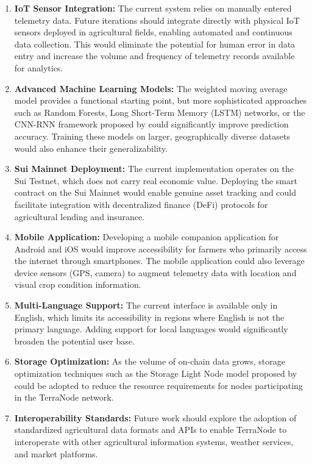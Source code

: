 \begin{enumerate}
    \item \textbf{IoT Sensor Integration:} The current system relies on manually entered telemetry data. Future iterations should integrate directly with physical IoT sensors deployed in agricultural fields, enabling automated and continuous data collection. This would eliminate the potential for human error in data entry and increase the volume and frequency of telemetry records available for analytics.

    \item \textbf{Advanced Machine Learning Models:} The weighted moving average model provides a functional starting point, but more sophisticated approaches such as Random Forests, Long Short-Term Memory (LSTM) networks, or the CNN-RNN framework proposed by \textcite{khaki2019cnn} could significantly improve prediction accuracy. Training these models on larger, geographically diverse datasets would also enhance their generalizability.

    \item \textbf{Sui Mainnet Deployment:} The current implementation operates on the Sui Testnet, which does not carry real economic value. Deploying the smart contract on the Sui Mainnet would enable genuine asset tracking and could facilitate integration with decentralized finance (DeFi) protocols for agricultural lending and insurance.

    \item \textbf{Mobile Application:} Developing a mobile companion application for Android and iOS would improve accessibility for farmers who primarily access the internet through smartphones. The mobile application could also leverage device sensors (GPS, camera) to augment telemetry data with location and visual crop condition information.

    \item \textbf{Multi-Language Support:} The current interface is available only in English, which limits its accessibility in regions where English is not the primary language. Adding support for local languages would significantly broaden the potential user base.

    \item \textbf{Storage Optimization:} As the volume of on-chain data grows, storage optimization techniques such as the Storage Light Node model proposed by \textcite{sun2025storage} could be adopted to reduce the resource requirements for nodes participating in the TerraNode network.

    \item \textbf{Interoperability Standards:} Future work should explore the adoption of standardized agricultural data formats and APIs to enable TerraNode to interoperate with other agricultural information systems, weather services, and market platforms.
\end{enumerate}

